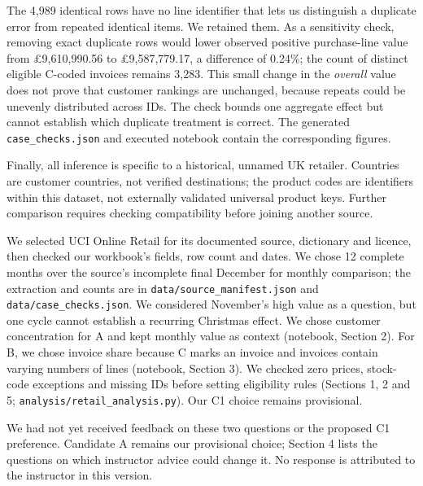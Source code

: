 \documentclass[10pt,a4paper]{article}
\newcommand{\sectionhead}[1]{\vspace{0.34em}{\large\bfseries\color{navy}#1}\par\vspace{0.08em}}
\newcommand{\subhead}[1]{\vspace{0.18em}{\bfseries #1}\par}
\begin{document}
\pagebreak
\subhead{Duplicate sensitivity}
The 4,989 identical rows have no line identifier that lets us distinguish a duplicate error from repeated identical items. We retained them. As a sensitivity check, removing exact duplicate rows would lower observed positive purchase-line value from \pounds9,610,990.56 to \pounds9,587,779.17, a difference of 0.24\%; the count of distinct eligible C-coded invoices remains 3,283. This small change in the \emph{overall} value does not prove that customer rankings are unchanged, because repeats could be unevenly distributed across IDs. The check bounds one aggregate effect but cannot establish which duplicate treatment is correct. The generated \texttt{case\_checks.json} and executed notebook contain the corresponding figures.

Finally, all inference is specific to a historical, unnamed UK retailer. Countries are customer countries, not verified destinations; the product codes are identifiers within this dataset, not externally validated universal product keys. Further comparison requires checking compatibility before joining another source.


\sectionhead{6\quad Process record}
\begingroup\small
\subhead{Decisions and checks}
We selected UCI Online Retail for its documented source, dictionary and licence, then checked our workbook's fields, row count and dates. We chose 12 complete months over the source's incomplete final December for monthly comparison; the extraction and counts are in \texttt{data/source\_manifest.json} and \texttt{data/case\_checks.json}. We considered November's high value as a question, but one cycle cannot establish a recurring Christmas effect. We chose customer concentration for A and kept monthly value as context (notebook, Section 2). For B, we chose invoice share because C marks an invoice and invoices contain varying numbers of lines (notebook, Section 3). We checked zero prices, stock-code exceptions and missing IDs before setting eligibility rules (Sections 1, 2 and 5; \texttt{analysis/retail\_analysis.py}). Our C1 choice remains provisional.

\subhead{Instructor feedback and response}
We had not yet received feedback on these two questions or the proposed C1 preference. Candidate A remains our provisional choice; Section 4 lists the questions on which instructor advice could change it. No response is attributed to the instructor in this version.
\end{document}
